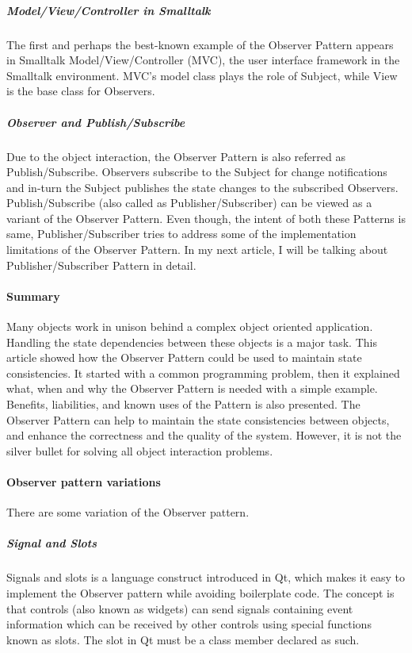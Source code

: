 \documentclass{book}
\begin{document}
\subparagraph{Model/View/Controller in Smalltalk}

The first and perhaps the best-known example of the Observer Pattern appears in Smalltalk Model/View/Controller (MVC), the user interface framework in the Smalltalk environment.
MVC's model class plays the role of Subject, while View is the base class for Observers.

\subparagraph{Observer and Publish/Subscribe}

Due to the object interaction, the Observer Pattern is also referred as Publish/Subscribe.
Observers subscribe to the Subject for change notifications and in-turn the Subject publishes the state changes to the subscribed Observers.
Publish/Subscribe (also called as Publisher/Subscriber) can be viewed as a variant of the Observer Pattern.
Even though, the intent of both these Patterns is same, Publisher/Subscriber tries to address some of the implementation limitations of the Observer Pattern.
In my next article, I will be talking about Publisher/Subscriber Pattern in detail.

\paragraph{Summary}

Many objects work in unison behind a complex object oriented application. Handling the state dependencies between these objects is a major task.
This article showed how the Observer Pattern could be used to maintain state consistencies.
It started with a common programming problem, then it explained what, when and why the Observer Pattern is needed with a simple example.
Benefits, liabilities, and known uses of the Pattern is also presented.
The Observer Pattern can help to maintain the state consistencies between objects, and enhance the correctness and the quality of the system.
However, it is not the silver bullet for solving all object interaction problems.

\paragraph{Observer pattern variations}

There are some variation of the Observer pattern.

\subparagraph{Signal and Slots}

    Signals and slots is a language construct introduced in Qt, which makes it easy to implement the Observer pattern while avoiding boilerplate code.
    The concept is that controls (also known as widgets) can send signals containing event information which can be received by other controls using special functions known as slots.
    The slot in Qt must be a class member declared as such.
\end{document}
